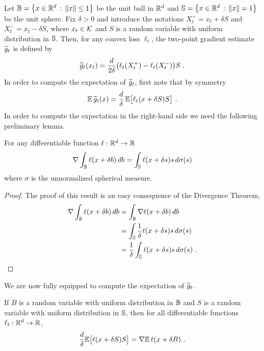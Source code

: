 Let $\mathbb{B} = \left\{{x \in \mathbb{R}^d}\,:\,{\left\|{x}\right\| \le 1}\right\}$ be the unit ball in $\mathbb{R}^d$ and $\mathbb{S} = \left\{{x \in \mathbb{R}^d}\,:\,{\left\|{x}\right\| = 1}\right\}$ be the unit sphere.
Fix $\delta > 0$ and introduce the notations $X_t^+ = x_t + \delta S$ and $X_t^- = x_t - \delta S$, where $x_t \in \mathcal{K}$ and $S$ is a random variable with uniform distribution in $\mathbb{S}$. Then, for any convex loss $\ell_t$, the two-point gradient estimate $\widetilde{g}_t$ is defined by
\begin{equation}
\label{eq:two-point-est}
    \widetilde{g}_t(x_t) = \frac{d}{2\delta}\bigl(\ell_t(X_t^+) - \ell_t(X_t^-) \bigr)S~.
\end{equation}
In order to compute the expectation of $\widetilde{g}_t$, first note that by symmetry
\[
    \mathbb{E}\,\widetilde{g}_t(x) = \frac{d}{\delta}\,\mathbb{E}\bigl[\ell_t(x + \delta S)S\bigr]~.
\]
In order to compute the expectation in the right-hand side we need the following preliminary lemma.
%
\begin{lemma}
\label{l:divergence}
For any differentiable function $\ell : \mathbb{R}^d \to \mathbb{R}$
\[
    \nabla\int_{\mathbb{B}} \ell(x + \delta b)\,db = \int_{\mathbb{S}} \ell(x + \delta s)s\,d\sigma(s)
\]
where $\sigma$ is the unnormalized spherical measure.
\end{lemma}
%
\begin{proof}
The proof of this result is an easy consequence of the Divergence Theorem,
\begin{align*}
    \nabla\int_{\mathbb{B}} \ell(x + \delta b)\,db
&=
    \int_{\mathbb{B}} \nabla \ell(x + \delta b)\,db
\\ &=
    \int_{\mathbb{S}} \frac{1}{\delta} \ell(x + \delta s)s\,d \sigma(s)
\\ &=
    \frac{1}{\delta} \int_{\mathbb{S}} \ell(x + \delta s)s\,d \sigma(s)~.
\end{align*}
\end{proof}
%
We are now fully equipped to compute the expectation of $\widetilde{g}_t$.
%
\begin{lemma}
\label{l:stokes}
If $B$ is a random variable with uniform distribution in $\mathbb{B}$ and $S$ is a random variable with uniform distribution in $\mathbb{S}$, then for all differentiable functions $\ell_t : \mathbb{R}^d\to\mathbb{R}$,
\[
    \frac{d}{\delta}\mathbb{E}\bigl[\ell(x + \delta S)S\bigr] = \nabla\mathbb{E}\,\ell(x + \delta B)~.
\]
\end{lemma}
%
